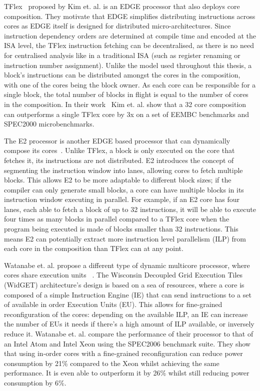 TFlex~\cite{kim2007tflex} proposed by Kim et. al. is an EDGE processor that also deploys core composition.
They motivate that EDGE simplifies distributing instructions across cores as EDGE itself is designed for distributed micro-architectures.
Since instruction dependency orders are determined at compile time and encoded at the ISA level, the TFlex instruction fetching can be decentralised, as there is no need for centralised analysis like in a traditional ISA (such as register renaming or instruction number assignment).
Unlike the model used throughout this thesis, a block's instructions can be distributed amongst the cores in the composition, with one of the cores being the block owner.
As each core can be responsible for a single block, the total number of blocks in flight is equal to the number of cores in the composition.
In their work~\cite{kim2007tflex} Kim et. al. show that a 32 core composition can outperforms a single TFlex core by 3x on a set of EEMBC benchmarks and SPEC2000 microbenchmarks.

The E2 processor is another EDGE based processor that can dynamically compose its cores~\cite{putnam2010e2}.
Unlike TFlex, a block is only executed on the core that fetches it, its instructions are not distributed.
E2 introduces the concept of segmenting the instruction window into lanes, allowing cores to fetch multiple blocks.
This allows E2 to be more adaptable to different block sizes; if the compiler can only generate small blocks, a core can have multiple blocks in its instruction window executing in parallel.
For example, if an E2 core has four lanes, each able to fetch a block of up to 32 instructions, it will be able to execute four times as many blocks in parallel compared to a TFlex core when the program being executed is made of blocks smaller than 32 instructions.
This means E2 can potentially extract more instruction level parallelism (ILP) from each core in the composition than TFlex can at any point.

Watanabe et. al. propose a different type of dynamic multicore processor, where cores share execution units ~\cite{Watanabe2010Widget}.
The Wisconsin Decoupled Grid Execution Tiles (WidGET) architecture's design is based on a sea of resources, where a core is composed of a simple Instruction Engine (IE) that can send instructions to a set of available in order Execution Units (EU).
This allows for fine-grained reconfiguration of the cores: depending on the available ILP, an IE can increase the number of EUs it needs if there's a high amount of ILP available, or inversely reduce it.
Watanabe et. al. compare the performance of their processor to that of an Intel Atom and Intel Xeon using the SPEC2006 benchmark suite.
They show that using in-order cores with a fine-grained reconfiguration can reduce power consumption by 21\% compared to the Xeon whilst achieving the same performance.
It is even able to outperform it by 26\% whilst still reducing power consumption by 6\%.

